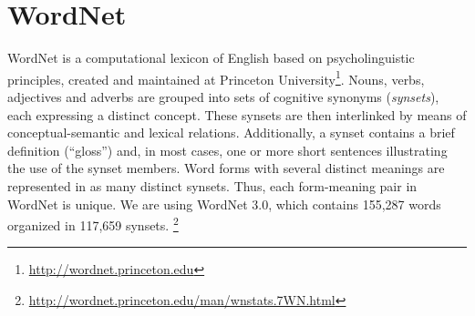 \section{WordNet}
WordNet \citep{miller1995wordnet} \citep{fellbaum1998wordnet} is a computational lexicon of English based on psycholinguistic principles, created and maintained at Princeton University\footnote{\url{http://wordnet.princeton.edu}}. Nouns, verbs, adjectives and adverbs are grouped into sets of cognitive synonyms (\textit{synsets}), each expressing a distinct concept. These synsets are then interlinked by means of conceptual-semantic and lexical relations. Additionally, a synset contains a brief definition (“gloss”) and, in most cases, one or more short sentences illustrating the use of the synset members. Word forms with several distinct meanings are represented in as many distinct synsets. Thus, each form-meaning pair in WordNet is unique. We are using WordNet 3.0, which contains 155,287 words organized in 117,659 synsets. \footnote{\url{http://wordnet.princeton.edu/man/wnstats.7WN.html}} 

